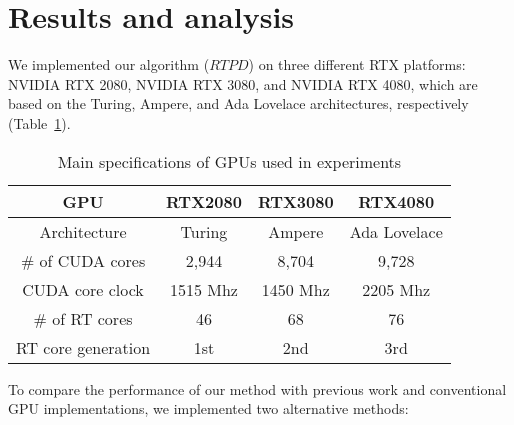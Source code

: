 \section{Results and analysis}\label{sec:result}

We implemented our algorithm ($RTPD$) on three different RTX platforms: NVIDIA RTX 2080, NVIDIA RTX 3080, and NVIDIA RTX 4080, which are based on the Turing, Ampere, and Ada Lovelace architectures, respectively (Table~\ref{table:GPUs}).

\begin{table}[t]
\centering
\caption{Main specifications of GPUs used in experiments}
\label{table:GPUs}
\small
\begin{tabular}{|c|c|c|c|}
\hline
GPU                  & RTX2080 & RTX3080 & RTX4080      \\ \hline
Architecture         & Turing  & Ampere  & Ada Lovelace \\ \hline
\# of CUDA   cores   & 2,944    & 8,704    & 9,728        \\ \hline
CUDA core clock             & 1515 Mhz      & 1450 Mhz      & 2205 Mhz           \\ \hline
\# of RT cores        & 46      & 68      & 76           \\ \hline
RT core generation & 1st     & 2nd     & 3rd          \\ \hline
\end{tabular}%
\end{table}



To compare the performance of our method with previous work and conventional GPU implementations, we implemented two alternative methods:


